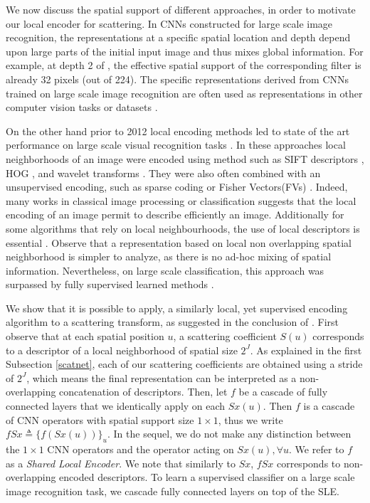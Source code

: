 \documentclass[10pt,twocolumn,letterpaper]{article}
\begin{document}
We now discuss the spatial support of different approaches, in order to motivate our local encoder for scattering. In CNNs constructed for large scale image recognition, the representations at a specific spatial location and depth depend upon large parts of the initial input image and thus mixes global  information. For example, at  depth 2 of \cite{krizhevsky2012imagenet}, the effective spatial support of the corresponding filter is already 32 pixels (out of 224). The specific representations derived from CNNs trained on large scale image recognition are often used as representations in other computer vision tasks or datasets \cite{yosinski2014transferable,zeiler2014visualizing}. 

On the other hand prior to  2012 local encoding methods led to state of the art performance on large scale visual recognition tasks \cite{sanchez2011high}. In these approaches local neighborhoods of an image were encoded using method such as SIFT descriptors \cite{lowe1999object}, HOG \cite{dalal2005histograms}, and wavelet transforms \cite{serre2004realistic}. They were also often combined with an unsupervised encoding, such as sparse coding \cite{boureau2011ask} or Fisher Vectors(FVs) \cite{sanchez2011high}. Indeed, many works in classical image processing or  classification \cite{koenderink1999structure,boureau2011ask,sanchez2011high,perronnin2015fisher} suggests that the local encoding of an image permit to describe efficiently an image. Additionally for some algorithms that rely on local neighbourhoods, the use of local descriptors is essential \cite{lowe1999object}. Observe that a representation based on local non overlapping spatial neighborhood is simpler to analyze, as there is no ad-hoc mixing of spatial information. Nevertheless, on large scale classification, this approach was surpassed by fully supervised learned methods \cite{krizhevsky2012imagenet}.










We show that it is possible to apply, a similarly local, yet supervised encoding algorithm to a scattering transform, as suggested in the conclusion of \cite{perronnin2015fisher}. First observe that at each spatial position $u$, a scattering coefficient $S(u)$ corresponds to a descriptor of a local neighborhood of spatial size $2^J$. As explained in the first Subsection \ref{scatnet}, each of our scattering coefficients are obtained using a stride of $2^J$, which means the final representation can be interpreted as a non-overlapping concatenation of  descriptors. Then, let $f$  be   a cascade of fully connected layers that we identically apply on each $Sx(u)$.  Then $f$ is a cascade of CNN  operators with spatial support size $1\times 1$, thus we write $fSx\triangleq \{f(Sx(u))\}_u$. In the sequel, we do not make any distinction between the $1\times1$ CNN operators and the operator acting on $Sx(u),\forall u$. We refer to $f$ as a \textit{Shared Local Encoder}. We note that similarly to $Sx$, $fSx$ corresponds to non-overlapping encoded descriptors. To learn a supervised classifier on a large scale image recognition task, we cascade fully connected layers on top of the SLE.
\end{document}
